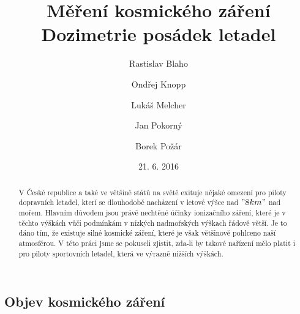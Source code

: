 \documentclass[12pt,a4paper]{article}
\begin{document}
\title{Měření kosmického záření\\Dozimetrie posádek letadel}
\author[1]{Rastislav Blaho}
\author[2]{Ondřej Knopp}
\author[3]{Lukáš Melcher}
\author[4]{Jan Pokorný}
\author[5]{Borek Požár}

\date{21. 6. 2016}

\maketitle

\thispagestyle{empty}

\begin{abstract}
V České republice a také ve většině států na světě exituje nějaké omezení pro piloty dopravních
letadel, kterí se dlouhodobě nacházení v letové výšce nad $"8 km"$ nad mořem. Hlavním důvodem
jsou právě nechtěné účinky ionizačního záření, které je v těchto výškách vůči podmínkám v nízkých
nadmořských výškach řádově větší. Je to dáno tím, že existuje silné kosmické záření, které je
však většinově pohlceno naší atmosférou. V této práci jsme se pokuseli zjistit, zda-li by takové
nařízení mělo platit i pro piloty sportovních letadel, která ve výrazně nižších výškách.
 

\end{abstract}
\subsection*{Objev kosmického záření}
\end{document}
